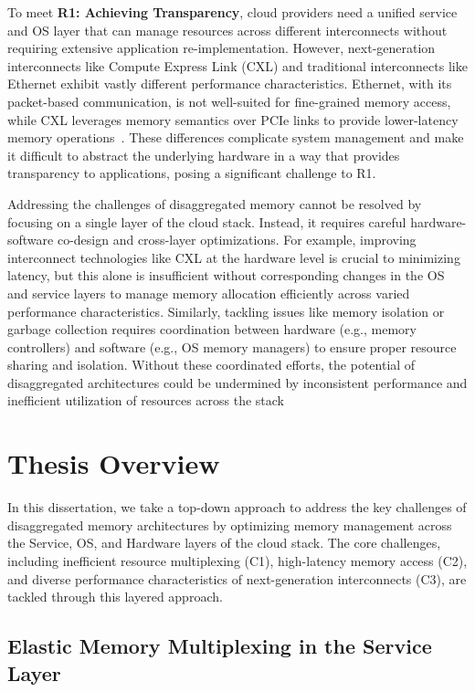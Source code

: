 To meet \textbf{R1: Achieving Transparency}, cloud providers need a unified service and OS layer that can manage resources across different interconnects without requiring extensive application re-implementation. However, next-generation interconnects like Compute Express Link (CXL) and traditional interconnects like Ethernet exhibit vastly different performance characteristics. Ethernet, with its packet-based communication, is not well-suited for fine-grained memory access, while CXL leverages memory semantics over PCIe links to provide lower-latency memory operations~\cite{cxl1, cxl2, demystify}. These differences complicate system management and make it difficult to abstract the underlying hardware in a way that provides transparency to applications, posing a significant challenge to R1.



Addressing the challenges of disaggregated memory cannot be resolved by focusing on a single layer of the cloud stack. Instead, it requires careful hardware-software co-design and cross-layer optimizations. For example, improving interconnect technologies like CXL at the hardware level is crucial to minimizing latency, but this alone is insufficient without corresponding changes in the OS and service layers to manage memory allocation efficiently across varied performance characteristics. Similarly, tackling issues like memory isolation or garbage collection requires coordination between hardware (e.g., memory controllers) and software (e.g., OS memory managers) to ensure proper resource sharing and isolation. Without these coordinated efforts, the potential of disaggregated architectures could be undermined by inconsistent performance and inefficient utilization of resources across the stack


\section{Thesis Overview}

In this dissertation, we take a top-down approach to address the key challenges of disaggregated memory architectures by optimizing memory management across the Service, OS, and Hardware layers of the cloud stack. The core challenges, including inefficient resource multiplexing (C1), high-latency memory access (C2), and diverse performance characteristics of next-generation interconnects (C3), are tackled through this layered approach.


\subsection{Elastic Memory Multiplexing in the Service Layer}

